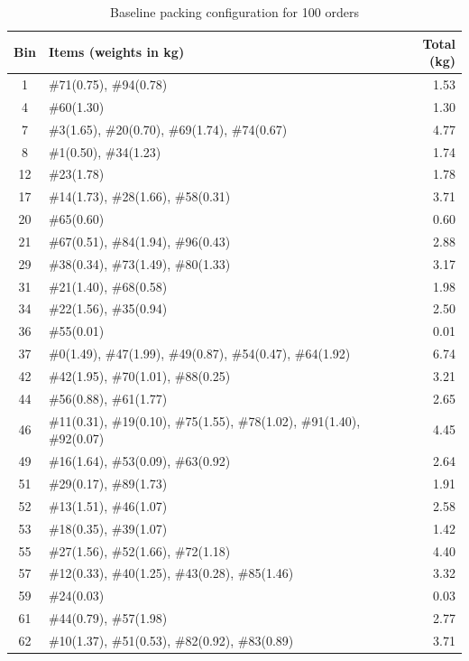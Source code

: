 \documentclass[journal,12pt,onecolumn]{IEEEtran}
\begin{document}
\begin{table}[htbp!]
\centering
\caption{Baseline packing configuration for 100 orders}
\label{tab:baseline100}
\begin{tabular}{|c|l|r|}
\hline
\textbf{Bin} & \textbf{Items (weights in kg)} & \textbf{Total (kg)} \\
\hline
1 & \#71(0.75), \#94(0.78) & 1.53 \\
\hline
4 & \#60(1.30) & 1.30 \\
\hline
7 & \#3(1.65), \#20(0.70), \#69(1.74), \#74(0.67) & 4.77 \\
\hline
8 & \#1(0.50), \#34(1.23) & 1.74 \\
\hline
12 & \#23(1.78) & 1.78 \\
\hline
17 & \#14(1.73), \#28(1.66), \#58(0.31) & 3.71 \\
\hline
20 & \#65(0.60) & 0.60 \\
\hline
21 & \#67(0.51), \#84(1.94), \#96(0.43) & 2.88 \\
\hline
29 & \#38(0.34), \#73(1.49), \#80(1.33) & 3.17 \\
\hline
31 & \#21(1.40), \#68(0.58) & 1.98 \\
\hline
34 & \#22(1.56), \#35(0.94) & 2.50 \\
\hline
36 & \#55(0.01) & 0.01 \\
\hline
37 & \#0(1.49), \#47(1.99), \#49(0.87), \#54(0.47), \#64(1.92) & 6.74 \\
\hline
42 & \#42(1.95), \#70(1.01), \#88(0.25) & 3.21 \\
\hline
44 & \#56(0.88), \#61(1.77) & 2.65 \\
\hline
46 & \#11(0.31), \#19(0.10), \#75(1.55), \#78(1.02), \#91(1.40), \#92(0.07) & 4.45 \\
\hline
49 & \#16(1.64), \#53(0.09), \#63(0.92) & 2.64 \\
\hline
51 & \#29(0.17), \#89(1.73) & 1.91 \\
\hline
52 & \#13(1.51), \#46(1.07) & 2.58 \\
\hline
53 & \#18(0.35), \#39(1.07) & 1.42 \\
\hline
55 & \#27(1.56), \#52(1.66), \#72(1.18) & 4.40 \\
\hline
57 & \#12(0.33), \#40(1.25), \#43(0.28), \#85(1.46) & 3.32 \\
\hline
59 & \#24(0.03) & 0.03 \\
\hline
61 & \#44(0.79), \#57(1.98) & 2.77 \\
\hline
62 & \#10(1.37), \#51(0.53), \#82(0.92), \#83(0.89) & 3.71 \\

\end{tabular}
\end{table}
\end{document}
